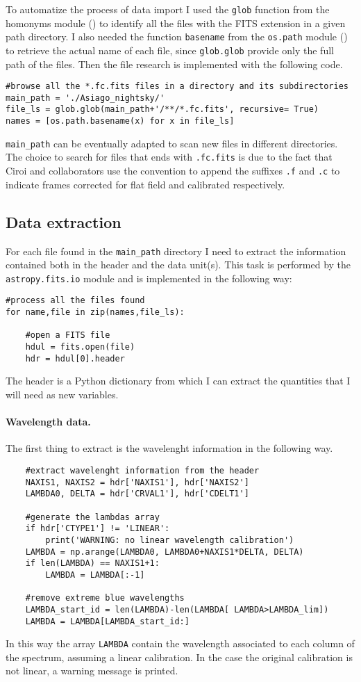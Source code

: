 To automatize the process of data import I used the \texttt{glob} function from the homonyms module () to identify all the files with the FITS extension in a given path directory. I also needed the function \texttt{basename} from the \texttt{os.path} module () to retrieve the actual name of each file, since \texttt{glob.glob} provide only the full path of the files. Then the file research is implemented with the following code.
\begin{lstlisting}
#browse all the *.fc.fits files in a directory and its subdirectories
main_path = './Asiago_nightsky/'
file_ls = glob.glob(main_path+'/**/*.fc.fits', recursive= True)
names = [os.path.basename(x) for x in file_ls]
\end{lstlisting}
\texttt{main\_path} can be eventually adapted to scan new files in different directories. The choice to search for files that ends with \texttt{.fc.fits} is due to the fact that Ciroi and collaborators use the convention to append the suffixes \texttt{.f} and \texttt{.c} to indicate frames corrected for flat field and calibrated respectively.

\subsection{Data extraction}
For each file found in the \texttt{main\_path} directory I need to extract the information contained both in the header and the data unit(s). This task is performed by the \texttt{astropy.fits.io} module and is implemented in the following way:
\begin{lstlisting}
#process all the files found
for name,file in zip(names,file_ls):

	#open a FITS file
	hdul = fits.open(file)
	hdr = hdul[0].header
\end{lstlisting}
The header is a Python dictionary from which I can extract the quantities that I will need as new variables.

\paragraph{Wavelength data.} The first thing to extract is the wavelenght information in the following way.
\begin{lstlisting}
	#extract wavelenght information from the header
	NAXIS1, NAXIS2 = hdr['NAXIS1'], hdr['NAXIS2']
	LAMBDA0, DELTA = hdr['CRVAL1'], hdr['CDELT1']
	
	#generate the lambdas array
	if hdr['CTYPE1'] != 'LINEAR':
		print('WARNING: no linear wavelength calibration')    
	LAMBDA = np.arange(LAMBDA0, LAMBDA0+NAXIS1*DELTA, DELTA)
	if len(LAMBDA) == NAXIS1+1:
		LAMBDA = LAMBDA[:-1]
	
	#remove extreme blue wavelengths
	LAMBDA_start_id = len(LAMBDA)-len(LAMBDA[ LAMBDA>LAMBDA_lim])
	LAMBDA = LAMBDA[LAMBDA_start_id:]
\end{lstlisting}
In this way the array \texttt{LAMBDA} contain the wavelength associated to each column of the spectrum, assuming a linear calibration. In the case the original calibration is not linear, a warning message is printed.

